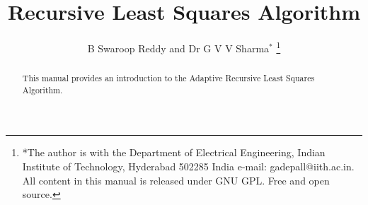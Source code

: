 \documentclass[journal,12pt,twocolumn]{IEEEtran}
\renewcommand\thesection{\arabic{section}}
\begin{document}
\let\StandardTheFigure\thefigure
\renewcommand{\thefigure}{\thesection}



\makeatletter
{}
\makeatother

\let\StandardTheFigure\thefigure
\let\StandardTheTable\thetable





\def\putbox#1#2#3{\makebox[0in][l]{\makebox[#1][l]{}\raisebox{\baselineskip}[0in][0in]{\raisebox{#2}[0in][0in]{#3}}}}
     \def\rightbox#1{\makebox[0in][r]{#1}}
     \def\centbox#1{\makebox[0in]{#1}}
     \def\topbox#1{\raisebox{-\baselineskip}[0in][0in]{#1}}
     \def\midbox#1{\raisebox{-0.5\baselineskip}[0in][0in]{#1}}

\vspace{3cm}


\title{ 
Recursive Least Squares Algorithm
}

\author{B Swaroop Reddy and Dr G V V Sharma$^{*}$%
	\thanks{*The author is with the Department
		of Electrical Engineering, Indian Institute of Technology, Hyderabad
		502285 India e-mail:  gadepall@iith.ac.in. All content in this manual is released under GNU GPL.  Free and open source.}
	
}	

\maketitle

\tableofcontents
\bigskip

\begin{abstract}
	
	This manual provides an introduction to the Adaptive Recursive Least Squares Algorithm.
	
\end{abstract}
\end{document}
